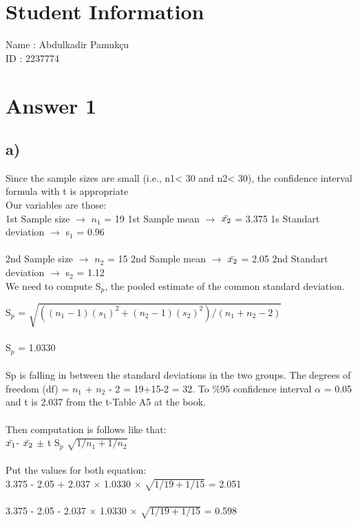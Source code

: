 \documentclass[12pt]{article}
\begin{document}
\section*{Student Information}

Name : Abdulkadir Pamukçu\\

ID : 2237774


\section*{Answer 1}

\subsection*{a)}
Since the sample sizes are small (i.e., n1< 30 and n2< 30), the confidence interval formula with t is appropriate\\
Our variables are those:\\ 1st Sample size $\rightarrow$ $n_1$ = 19  1st Sample mean $\rightarrow$ $\Bar{x_2}$ = 3.375 1s Standart deviation $\rightarrow$ s$_1$ = 0.96 \\
\\
2nd Sample size $\rightarrow$ $n_2$ = 15  2nd Sample mean $\rightarrow$ $\Bar{x_2}$ = 2.05 2nd Standart deviation $\rightarrow$ s$_2$ = 1.12\\
 
We need to compute S$_p$, the pooled estimate of the common standard deviation.
 
S$_p$ = $\sqrt{ ((n_1 -1)(s_1)^2 + (n_2 - 1)(s_2)^2)  / ( n_1 + n_2 - 2)    }   $\\
 \\
S$_p$ = 1.0330\\
\\
Sp is falling in between the standard deviations in the two groups. The degrees of freedom (df) = $n_1$ + $n_2$ - 2  = 19+15-2 = 32. To $\%$95 confidence interval $\alpha$ = 0.05 and t is 2.037 from the t-Table A5 at the book. \\
\\
Then computation is follows like that:\\

$\Bar{x_1}$- $\Bar{x_2}$ $\pm$  t  S$_p$ $\sqrt{1/ n_1 + 1/n_2}$\\
\\
Put the values for both equation:\\

3.375 - 2.05 +  2.037 $\times$ 1.0330 $\times$ $\sqrt{1/ 19 + 1/15}$ = 2.051\\
\\
3.375 - 2.05 -  2.037 $\times$ 1.0330 $\times$ $\sqrt{1/ 19 + 1/15}$ = 0.598\\
\end{document}
